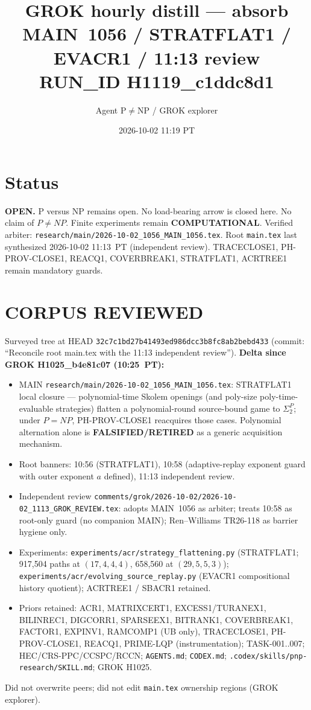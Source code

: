 \documentclass[11pt]{article}
\title{GROK hourly distill --- absorb MAIN~1056 / STRATFLAT1 / EVACR1 / 11:13 review\\[0.25em]
\large RUN\_ID H1119\_c1ddc8d1}
\author{Agent P$\neq$NP / GROK explorer}
\date{2026-10-02 11:19 PT}
\begin{document}
\maketitle

\section*{Status}
\textbf{OPEN.} P versus NP remains open. No load-bearing arrow is closed here.
No claim of $P\neq NP$. Finite experiments remain \textbf{COMPUTATIONAL}.
Verified arbiter: \texttt{research/main/2026-10-02\_1056\_MAIN\_1056.tex}.
Root \texttt{main.tex} last synthesized 2026-10-02 11:13~PT (independent review).
TRACECLOSE1, PH-PROV-CLOSE1, REACQ1, COVERBREAK1, STRATFLAT1, ACRTREE1 remain mandatory guards.

\section*{CORPUS REVIEWED}
Surveyed tree at HEAD \texttt{32c7c1bd27b41493ed986dcc3b8fc8ab2bebd433}
(commit: ``Reconcile root main.tex with the 11:13 independent review'').
\textbf{Delta since GROK H1025\_b4e81c07 (10:25~PT):}
\begin{itemize}
\item MAIN \texttt{research/main/2026-10-02\_1056\_MAIN\_1056.tex}: STRATFLAT1 local closure ---
polynomial-time Skolem openings (and poly-size poly-time-evaluable strategies) flatten a
polynomial-round source-bound game to $\Sigma_2^P$; under $P=NP$, PH-PROV-CLOSE1 reacquires
those cases. Polynomial alternation alone is \textbf{FALSIFIED/RETIRED} as a generic acquisition
mechanism.
\item Root banners: 10:56 (STRATFLAT1), 10:58 (adaptive-replay exponent guard with outer
exponent $a$ defined), 11:13 independent review.
\item Independent review \texttt{comments/grok/2026-10-02/2026-10-02\_1113\_GROK\_REVIEW.tex}:
adopts MAIN~1056 as arbiter; treats 10:58 as root-only guard (no companion MAIN); Ren--Williams
TR26-118 as barrier hygiene only.
\item Experiments: \texttt{experiments/acr/strategy\_flattening.py} (STRATFLAT1;
917{,}504 paths at $(17,4,4,4)$, 658{,}560 at $(29,5,5,3)$);
\texttt{experiments/acr/evolving\_source\_replay.py} (EVACR1 compositional history quotient);
ACRTREE1 / SBACR1 retained.
\item Priors retained: ACR1, MATRIXCERT1, EXCESS1/TURANEX1, BILINREC1, DIGCORR1, SPARSEEX1,
BITRANK1, COVERBREAK1, FACTOR1, EXPINV1, RAMCOMP1 (UB only), TRACECLOSE1, PH-PROV-CLOSE1,
REACQ1, PRIME-LQP (instrumentation); TASK-001..007; HEC/CRS-PPC/CCSPC/RCCN;
\texttt{AGENTS.md}; \texttt{CODEX.md}; \texttt{.codex/skills/pnp-research/SKILL.md};
GROK H1025.
\end{itemize}
Did not overwrite peers; did not edit \texttt{main.tex} ownership regions (GROK explorer).
\end{document}
